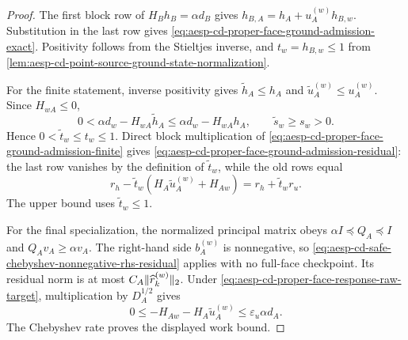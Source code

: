 \begin{proof}
The first block row of \(H_Bh_B=\alpha d_B\) gives
\(h_{B,A}=h_A+u_A^{(w)}h_{B,w}\).  Substitution in the last row gives
\cref{eq:aesp-cd-proper-face-ground-admission-exact}.  Positivity follows
from the Stieltjes inverse, and \(t_w=h_{B,w}\leq1\) from
\cref{lem:aesp-cd-point-source-ground-state-normalization}.

For the finite statement, inverse positivity gives
\(\widetilde h_A\leq h_A\) and
\(\widetilde u_A^{(w)}\leq u_A^{(w)}\).  Since \(H_{wA}\leq0\),
\begin{equation*}
 0<\alpha d_w-H_{wA}\widetilde h_A
 \leq\alpha d_w-H_{wA}h_A,
 \qquad
 \widetilde s_w\geq s_w>0.
\end{equation*}
Hence \(0<\widetilde t_w\leq t_w\leq1\).  Direct block multiplication of
\cref{eq:aesp-cd-proper-face-ground-admission-finite} gives
\cref{eq:aesp-cd-proper-face-ground-admission-residual}: the last row vanishes
by the definition of \(\widetilde t_w\), while the old rows equal
\begin{equation*}
 r_h-\widetilde t_w
       (H_A\widetilde u_A^{(w)}+H_{Aw})
 =r_h+\widetilde t_wr_u.
\end{equation*}
The upper bound uses \(\widetilde t_w\leq1\).

For the final specialization, the normalized principal matrix obeys
\(\alpha I\preceq Q_A\preceq I\) and
\(Q_Av_A\geq\alpha v_A\).  The right-hand side \(b_A^{(w)}\) is nonnegative,
so \cref{eq:aesp-cd-safe-chebyshev-nonnegative-rhs-residual} applies with no
full-face checkpoint.  Its residual norm is at most
\(C_A\lVert\widehat r_k^{(w)}\rVert_2\).  Under
\cref{eq:aesp-cd-proper-face-response-raw-target}, multiplication by
\(D_A^{1/2}\) gives
\begin{equation*}
 0\leq-H_{Aw}-H_A\widetilde u_A^{(w)}
 \leq\varepsilon_u\alpha d_A.
\end{equation*}
The Chebyshev rate proves the displayed work bound.
\end{proof}

